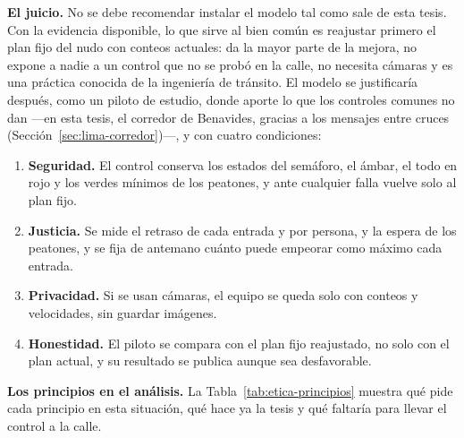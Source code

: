 \noindent\textbf{El juicio.} No se debe recomendar instalar el modelo tal
como sale de esta tesis. Con la evidencia disponible, lo que sirve al bien
común es reajustar primero el plan fijo del nudo con conteos actuales:
da la mayor parte de la mejora, no expone a nadie a un control que no se
probó en la calle, no necesita cámaras y es una práctica conocida de la
ingeniería de tránsito. El modelo se justificaría después, como un
piloto de estudio, donde aporte lo que los controles comunes no dan
---en esta tesis, el corredor de Benavides, gracias a los mensajes entre
cruces (Sección~\ref{sec:lima-corredor})---, y con cuatro condiciones:
\begin{enumerate}
  \item \textbf{Seguridad.} El control conserva los estados del
    semáforo, el ámbar, el todo en rojo y los verdes mínimos de los
    peatones, y ante cualquier falla vuelve solo al plan fijo.
  \item \textbf{Justicia.} Se mide el retraso de cada entrada y por
    persona, y la espera de los peatones, y se fija de antemano cuánto
    puede empeorar como máximo cada entrada.
  \item \textbf{Privacidad.} Si se usan cámaras, el equipo se queda
    solo con conteos y velocidades, sin guardar imágenes.
  \item \textbf{Honestidad.} El piloto se compara con el plan fijo
    reajustado, no solo con el plan actual, y su resultado se publica
    aunque sea desfavorable.
\end{enumerate}

\noindent\textbf{Los principios en el análisis.} La
Tabla~\ref{tab:etica-principios} muestra qué pide cada principio en esta
situación, qué hace ya la tesis y qué faltaría para llevar el control a
la calle.

